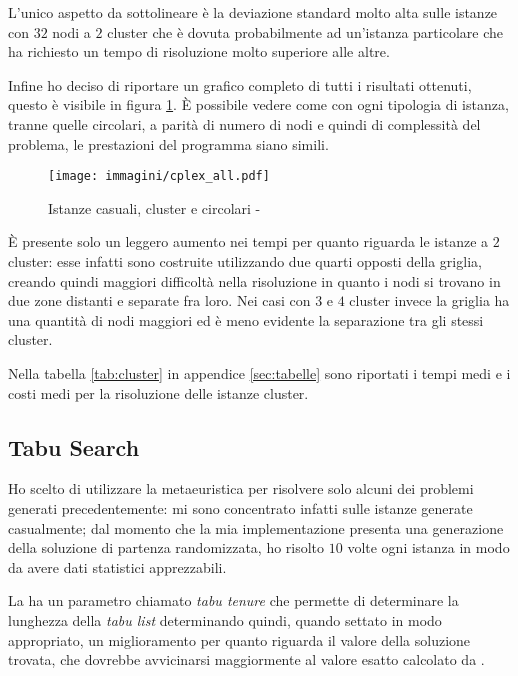 L'unico aspetto da sottolineare è la deviazione standard molto alta sulle istanze con $32$ nodi a $2$ cluster che è dovuta probabilmente ad un'istanza particolare che ha richiesto un tempo di risoluzione molto superiore alle altre.

Infine ho deciso di riportare un grafico completo di tutti i risultati ottenuti, questo è visibile in figura \ref{fig:all cplex}.
È possibile vedere come con ogni tipologia di istanza, tranne quelle circolari, a parità di numero di nodi e quindi di complessità del problema, le prestazioni del programma siano simili.

\begin{figure}[htb]
	\centering
	\texttt{[image: immagini/cplex\_all.pdf]}
	\caption{Istanze casuali, cluster e circolari - }
	\label{fig:all cplex}
\end{figure}

È presente solo un leggero aumento nei tempi per quanto riguarda le istanze a $2$ cluster: esse infatti sono costruite utilizzando due quarti opposti della griglia, creando quindi maggiori difficoltà nella risoluzione in quanto i nodi si trovano in due zone distanti e separate fra loro.
Nei casi con $3$ e $4$ cluster invece la griglia ha una quantità di nodi maggiori ed è meno evidente la separazione tra gli stessi cluster.

Nella tabella \ref{tab:cluster} in appendice \ref{sec:tabelle} sono riportati i tempi medi e i costi medi per la risoluzione delle istanze cluster.

\subsection{Tabu Search}

Ho scelto di utilizzare la metaeuristica \tabu per risolvere solo alcuni dei problemi generati precedentemente: mi sono concentrato infatti sulle istanze generate casualmente; dal momento che la mia implementazione presenta una generazione della soluzione di partenza randomizzata, ho risolto $10$ volte ogni istanza in modo da avere dati statistici apprezzabili.

La \tabu ha un parametro chiamato \emph{tabu tenure} che permette di determinare la lunghezza della \emph{tabu list} determinando quindi, quando settato in modo appropriato, un miglioramento per quanto riguarda il valore della soluzione trovata, che dovrebbe avvicinarsi maggiormente al valore esatto calcolato da .


